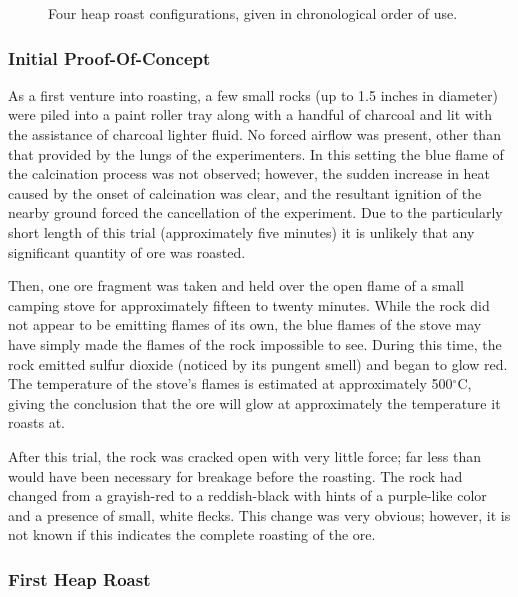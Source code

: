 \begin{figure}[htb]
\caption{Four heap roast configurations, given in chronological order of use.}
\label{fig:heaproast}
\end{figure}

\subsubsection{Initial Proof-Of-Concept}

As a first venture into roasting, a few small rocks (up to 1.5 inches in
diameter) were piled into a paint roller tray along with a handful of charcoal
and lit with the assistance of charcoal lighter fluid.  No forced airflow was
present, other than that provided by the lungs of the experimenters.  In this
setting the blue flame of the calcination process was not observed; however, the
sudden increase in heat caused by the onset of calcination was clear, and the
resultant ignition of the nearby ground forced the cancellation of the
experiment.  Due to the particularly short length of this trial (approximately
five minutes) it is unlikely that any significant quantity of ore was roasted.

Then, one ore fragment was taken and held over the open flame of a small camping
stove for approximately fifteen to twenty minutes.  While the rock did not
appear to be emitting flames of its own, the blue flames of the stove may have
simply made the flames of the rock impossible to see.  During this time, the
rock emitted sulfur dioxide (noticed by its pungent smell) and began to glow
red.  The temperature of the stove's flames is estimated at approximately
500$^\circ$C, giving the conclusion that the ore will glow at approximately the
temperature it roasts at.

After this trial, the rock was cracked open with very little force; far less
than would have been necessary for breakage before the roasting.  The rock had
changed from a grayish-red to a reddish-black with hints of a purple-like color
and a presence of small, white flecks.  This change was very obvious; however,
it is not known if this indicates the complete roasting of the ore.

\subsubsection{First Heap Roast}
